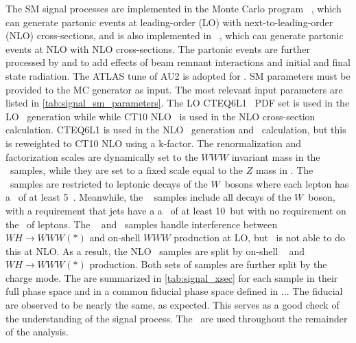 The SM signal processes are implemented in the Monte
Carlo program \vbfnlo~\cite{Arnold:2011wj,Arnold:2012xn},
which can generate partonic events at leading-order (LO) with
next-to-leading-order (NLO) cross-sections, 
and is also implemented in \madgraph~\cite{MadGraph}, which can generate
partonic events at NLO with NLO cross-sections. 
The partonic events are further processed 
by \pythiaeight\cite{Sjostrand:2007gs} and \photos\cite{Golonka:2005pn} 
to add effects of beam remnant interactions and initial and 
final state radiation. 
The ATLAS tune of AU2\cite{ATLAS:2011zja} is adopted for \pythiaeight.  
SM parameters must be provided to the MC generator as input. The most 
relevant input parameters are listed in \tab\ref{tab:signal_sm_parameters}.
The LO CTEQ6L1~\cite{Pumplin:2002vw} PDF set is used in the 
LO \vbfnlo~generation while while CT10 NLO~\cite{Guzzi:2011sv}
is used in the NLO cross-section calculation.
CTEQ6L1 is used in the NLO \madgraph~generation and
\xsec~calculation, but this is reweighted to
CT10 NLO using a k-factor.
The renormalization and factorization scales are dynamically
set to the $WWW$ invariant mass in the \vbfnlo~samples, while they 
are set to a fixed scale equal to the $Z$ mass in \madgraph.
The \vbfnlo~samples are restricted to leptonic decays of the $W$~bosons
where each lepton has a \pt~of at least 5~\GeV. Meanwhile, the \madgraph~
samples include all decays of the $W$~boson, with a requirement 
that jets have a a \pt~of at least 10~\GeV but with no requirement
on the \pt~of leptons.
The \vbfnlo~ and \madgraph~samples handle interference 
between $WH\rightarrow WWW(*)$ 
and on-shell $WWW$ production at LO, but \madgraph~is not
able to do this at NLO. As a result, the NLO \madgraph~samples
are split by on-shell \www~ and $WH\rightarrow WWW(*)$ production.
Both sets of samples are further split by the \www charge mode.
The \xsecs are summarized in \tab\ref{tab:signal_xsec} for each sample
in their full phase space and in a common fiducial phase space
defined in \sec...  The fiducial \xsecs are observed to be nearly the same,
as expected.  This serves as a good check of the understanding of the 
signal process. The \madgraph~\xsecs are used throughout the remainder of the
analysis.







